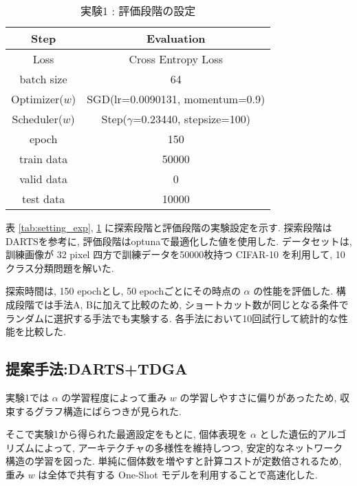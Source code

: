 \begin{table}[tb]
  \begin{center}
    \caption{実験1 : 評価段階の設定}
  	\vspace{3mm}
    \begin{tabular}{|c|c|} \hline
      Step & Evaluation \\ \hline\hline
      Loss & Cross Entropy Loss \\ \hline
      batch size & 64 \\ \hline
      Optimizer($w$) & SGD(lr=0.0090131, momentum=0.9) \\ \hline
      Scheduler($w$) & Step($\gamma$=0.23440, stepsize=100) \\ \hline
      epoch & 150\\ \hline
      train data & 50000\\ \hline
      valid data & 0\\ \hline
      test data &  10000\\ \hline
    \end{tabular}
    \label{tab:setting_eval}
  \end{center}
\end{table}

表 \ref{tab:setting_exp}, \ref{tab:setting_eval} に探索段階と評価段階の実験設定を示す.
探索段階はDARTSを参考に, 評価段階はoptunaで最適化した値を使用した.
データセットは, 訓練画像が 32 pixel 四方で訓練データを50000枚持つ CIFAR-10\cite{cifar10} を利用して,
10クラス分類問題を解いた.

探索時間は, 150 epochとし, 50 epochごとにその時点の $\alpha$ の性能を評価した.
構成段階では手法A, Bに加えて比較のため,
ショートカット数が同じとなる条件でランダムに選択する手法でも実験する.
各手法において10回試行して統計的な性能を比較した.


\clearpage\newpage
\changeindent{0cm}
\subsection{提案手法:DARTS+TDGA}
\label{sec:pred.02}
\changeindent{2cm}


実験1では $\alpha$ の学習程度によって重み $w$ の学習しやすさに偏りがあったため,
収束するグラフ構造にばらつきが見られた.

そこで実験1から得られた最適設定をもとに,
個体表現を $\alpha$ とした遺伝的アルゴリズムによって,
アーキテクチャの多様性を維持しつつ, 安定的なネットワーク構造の学習を図った.
単純に個体数を増やすと計算コストが定数倍されるため,
重み $w$ は全体で共有する One-Shot モデルを利用することで高速化した.

